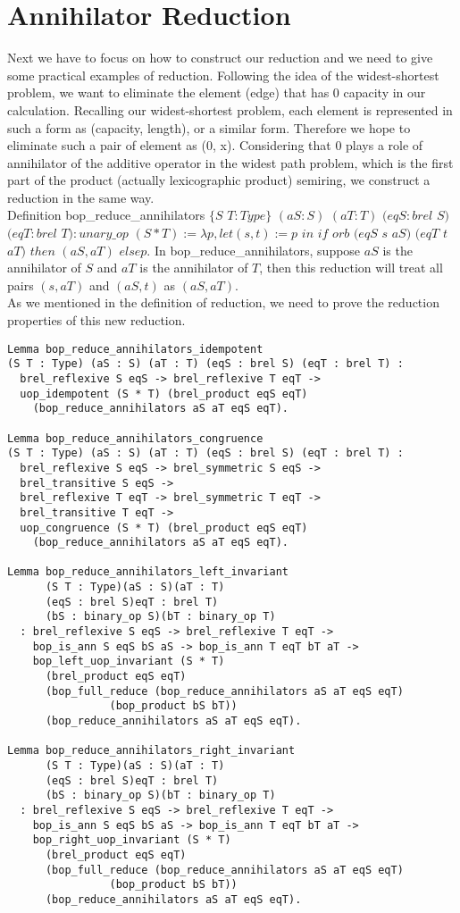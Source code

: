 \documentclass[a4paper,12pt,twoside,openright]{report}
\begin{document}
\section{Annihilator Reduction}
Next we have to focus on how to construct our reduction and we need to give some practical examples of reduction.
Following the idea of the widest-shortest problem, we want to eliminate the element (edge) that has 0 capacity in our calculation. 
Recalling our widest-shortest problem, each element is represented in such a form as (capacity, length), or a similar form. Therefore we hope to eliminate such a pair of element as (0, x). Considering that 0 plays a role of annihilator of the additive operator in the widest path problem, which is the first part of the product (actually lexicographic product) semiring, we construct a reduction in the same way.\\
Definition bop\_reduce\_annihilators $\{S$ $T : Type\}$ $(aS : S)$ $(aT : T)$ $(eqS : brel$ $S)$ $(eqT : brel$ $ T) : unary\_op$ $ (S * T)
  := \lambda p, let (s, t) := p$ $ in $ $if$ $ orb $ $(eqS$ $ s $ $aS) $ $(eqT $ $t $ $aT)$ $ then $ $(aS, aT) $ $else p.$
In bop\_reduce\_annihilators, suppose $aS$ is the annihilator of $S$ and $aT$ is the annihilator of $T$, then this reduction will treat all pairs $(s,aT)$ and $(aS,t)$ as $(aS,aT)$.\\
As we mentioned in the definition of reduction, we need to prove the reduction properties of this new reduction.
\begin{lstlisting}
Lemma bop_reduce_annihilators_idempotent 
(S T : Type) (aS : S) (aT : T) (eqS : brel S) (eqT : brel T) :
  brel_reflexive S eqS -> brel_reflexive T eqT -> 
  uop_idempotent (S * T) (brel_product eqS eqT) 
  	(bop_reduce_annihilators aS aT eqS eqT).

Lemma bop_reduce_annihilators_congruence 
(S T : Type) (aS : S) (aT : T) (eqS : brel S) (eqT : brel T) :
  brel_reflexive S eqS -> brel_symmetric S eqS -> 
  brel_transitive S eqS -> 
  brel_reflexive T eqT -> brel_symmetric T eqT -> 
  brel_transitive T eqT -> 
  uop_congruence (S * T) (brel_product eqS eqT) 
  	(bop_reduce_annihilators aS aT eqS eqT).
  	
Lemma bop_reduce_annihilators_left_invariant
      (S T : Type)(aS : S)(aT : T)
      (eqS : brel S)eqT : brel T)
      (bS : binary_op S)(bT : binary_op T)      
  : brel_reflexive S eqS -> brel_reflexive T eqT -> 
    bop_is_ann S eqS bS aS -> bop_is_ann T eqT bT aT -> 
    bop_left_uop_invariant (S * T)
      (brel_product eqS eqT)
      (bop_full_reduce (bop_reduce_annihilators aS aT eqS eqT) 
      			(bop_product bS bT))
      (bop_reduce_annihilators aS aT eqS eqT).

Lemma bop_reduce_annihilators_right_invariant
      (S T : Type)(aS : S)(aT : T)
      (eqS : brel S)eqT : brel T)
      (bS : binary_op S)(bT : binary_op T)      
  : brel_reflexive S eqS -> brel_reflexive T eqT -> 
    bop_is_ann S eqS bS aS -> bop_is_ann T eqT bT aT ->     
    bop_right_uop_invariant (S * T)
      (brel_product eqS eqT)
      (bop_full_reduce (bop_reduce_annihilators aS aT eqS eqT) 
      			(bop_product bS bT))
      (bop_reduce_annihilators aS aT eqS eqT).
\end{lstlisting}
\end{document}
